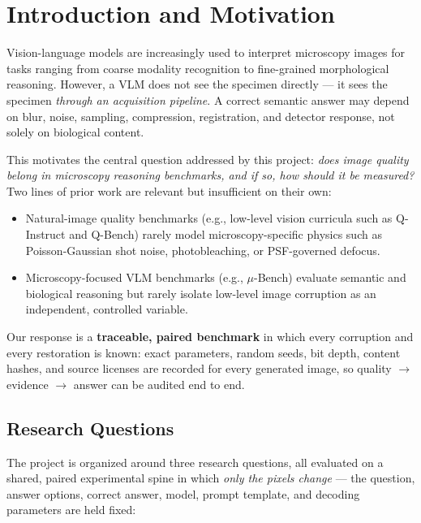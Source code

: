 \documentclass[11pt]{article}
\begin{document}
\section{Introduction and Motivation}

Vision-language models are increasingly used to interpret microscopy images for
tasks ranging from coarse modality recognition to fine-grained morphological
reasoning. However, a VLM does not see the specimen directly --- it sees the
specimen \emph{through an acquisition pipeline}. A correct semantic answer may
depend on blur, noise, sampling, compression, registration, and detector response,
not solely on biological content.

This motivates the central question addressed by this project: \emph{does image
quality belong in microscopy reasoning benchmarks, and if so, how should it be
measured?} Two lines of prior work are relevant but insufficient on their own:

\begin{itemize}[leftmargin=1.4em]
    \item Natural-image quality benchmarks (e.g., low-level vision curricula such as
    Q-Instruct and Q-Bench) rarely model microscopy-specific physics such as
    Poisson-Gaussian shot noise, photobleaching, or PSF-governed defocus.
    \item Microscopy-focused VLM benchmarks (e.g., $\mu$-Bench) evaluate semantic and
    biological reasoning but rarely isolate low-level image corruption as an
    independent, controlled variable.
\end{itemize}

Our response is a \textbf{traceable, paired benchmark} in which every corruption and
every restoration is known: exact parameters, random seeds, bit depth, content
hashes, and source licenses are recorded for every generated image, so quality
$\to$ evidence $\to$ answer can be audited end to end.

\subsection{Research Questions}

The project is organized around three research questions, all evaluated on a shared,
paired experimental spine in which \emph{only the pixels change} --- the question,
answer options, correct answer, model, prompt template, and decoding parameters are
held fixed:
\end{document}
